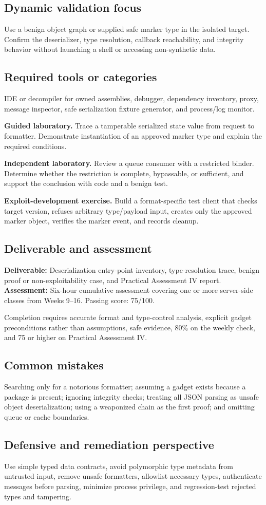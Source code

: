 \documentclass[11pt]{article}
\newcommand{\weekfield}[2]{%
  \Needspace{5\baselineskip}
  \subsection*{#1}
  #2
}
\newcommand{\deliverable}[1]{\textbf{Deliverable:} #1}
\newcommand{\assessment}[1]{\textbf{Assessment:} #1}
\begin{document}
\weekfield{Dynamic validation focus}{Use a benign object graph or supplied safe
marker type in the isolated target. Confirm the deserializer, type resolution,
callback reachability, and integrity behavior without launching a shell or
accessing non-synthetic data.}

\weekfield{Required tools or categories}{IDE or decompiler for owned assemblies,
debugger, dependency inventory, proxy, message inspector, safe serialization
fixture generator, and process/log monitor.}

\begin{labbox}
\textbf{Guided laboratory.} Trace a tamperable serialized state value from request
to formatter. Demonstrate instantiation of an approved marker type and explain
the required conditions.

\textbf{Independent laboratory.} Review a queue consumer with a restricted binder.
Determine whether the restriction is complete, bypassable, or sufficient, and
support the conclusion with code and a benign test.

\textbf{Exploit-development exercise.} Build a format-specific test client that
checks target version, refuses arbitrary type/payload input, creates only the
approved marker object, verifies the marker event, and records cleanup.
\end{labbox}

\weekfield{Deliverable and assessment}{\deliverable{Deserialization entry-point
inventory, type-resolution trace, benign proof or non-exploitability case, and
Practical Assessment IV report.}
\assessment{Six-hour cumulative assessment covering one or more server-side
classes from Weeks 9--16. Passing score: 75/100.}}

\begin{checkpoints}
Completion requires accurate format and type-control analysis, explicit gadget
preconditions rather than assumptions, safe evidence, 80\% on the weekly check,
and 75 or higher on Practical Assessment IV.
\end{checkpoints}

\weekfield{Common mistakes}{Searching only for a notorious formatter; assuming a
gadget exists because a package is present; ignoring integrity checks; treating
all JSON parsing as unsafe object deserialization; using a weaponized chain as the
first proof; and omitting queue or cache boundaries.}

\weekfield{Defensive and remediation perspective}{Use simple typed data contracts,
avoid polymorphic type metadata from untrusted input, remove unsafe formatters,
allowlist necessary types, authenticate messages before parsing, minimize process
privilege, and regression-test rejected types and tampering.}
\end{document}
